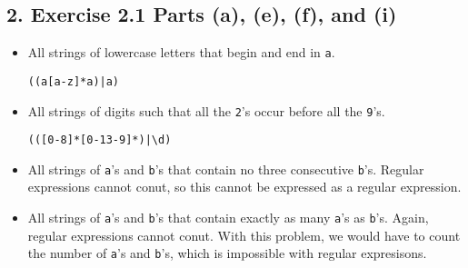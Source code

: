 \documentclass[12pt]{article}
\begin{document}
\subsection*{2. Exercise 2.1 Parts (a), (e), (f), and (i)}
\begin{itemize}
\item[a.] All strings of lowercase letters that begin and end in {\tt a}.
\begin{verbatim}((a[a-z]*a)|a)\end{verbatim}
\item[e.] All strings of digits such that all the {\tt 2}'s occur before all the {\tt 9}'s.
\begin{verbatim}(([0-8]*[0-13-9]*)|\d)\end{verbatim}
\item[f.] All strings of {\tt a}'s and {\tt b}'s that contain no three consecutive {\tt b}'s.
Regular expressions cannot conut, so this cannot be expressed as a regular expression.
\item[i.] All strings of {\tt a}'s and {\tt b}'s that contain exactly as many {\tt a}'s as {\tt b}'s.
Again, regular expressions cannot conut. With this problem, we would have to count the number of {\tt a}'s and {\tt b}'s, which is impossible with regular expresisons.
\begin{verbatim}\end{verbatim}
\end{itemize}
\end{document}
